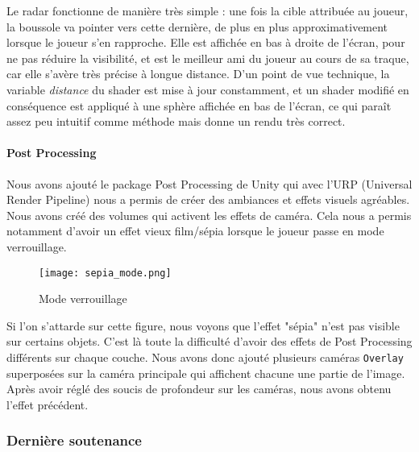         Le radar fonctionne de manière très simple : une fois la cible attribuée au joueur, la boussole va pointer vers cette dernière, de plus 
        en plus approximativement lorsque le joueur s'en rapproche. Elle est affichée en bas à droite de l'écran, pour ne pas réduire la 
        visibilité, et est le meilleur ami du joueur au cours de sa traque, car elle s'avère très précise à longue distance.
        D'un point de vue technique, la variable \textit{distance} du shader est mise à jour constamment, et un shader modifié en conséquence 
        est appliqué à une sphère affichée en bas de l'écran, ce qui paraît assez peu intuitif comme méthode mais donne un rendu très correct. 
        

        \paragraph{Post Processing}

        Nous avons ajouté le package Post Processing de Unity qui avec l'URP (Universal Render Pipeline)
        nous a permis de créer des ambiances et effets visuels agréables.
        Nous avons créé des volumes qui activent les effets de caméra.
        Cela nous a permis notamment d'avoir un effet vieux film/sépia lorsque le joueur passe en mode verrouillage.

        \begin{figure}[hbt!]
            \centering
            \texttt{[image: sepia\_mode.png]}
            \caption{Mode verrouillage}
        \end{figure}
        \FloatBarrier


        Si l'on s'attarde sur cette figure, nous voyons que l'effet "sépia" n'est pas visible sur certains objets.
        C'est là toute la difficulté d'avoir des effets de Post Processing différents sur chaque couche.
        Nous avons donc ajouté plusieurs caméras \texttt{Overlay} superposées sur la caméra principale qui affichent chacune une partie de l'image.
        Après avoir réglé des soucis de profondeur sur les caméras, nous avons obtenu l'effet précédent.

    \subsubsection{Dernière soutenance}

